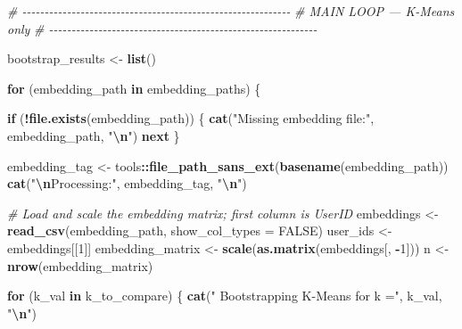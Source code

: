 \documentclass[
  11pt,
]{article}
\newenvironment{Shaded}{\begin{snugshade}}{\end{snugshade}}
\newcommand{\AttributeTok}[1]{\textcolor[rgb]{0.13,0.29,0.53}{#1}}
\newcommand{\CommentTok}[1]{\textcolor[rgb]{0.56,0.35,0.01}{\textit{#1}}}
\newcommand{\ConstantTok}[1]{\textcolor[rgb]{0.56,0.35,0.01}{#1}}
\newcommand{\ControlFlowTok}[1]{\textcolor[rgb]{0.13,0.29,0.53}{\textbf{#1}}}
\newcommand{\DecValTok}[1]{\textcolor[rgb]{0.00,0.00,0.81}{#1}}
\newcommand{\FunctionTok}[1]{\textcolor[rgb]{0.13,0.29,0.53}{\textbf{#1}}}
\newcommand{\NormalTok}[1]{#1}
\newcommand{\OtherTok}[1]{\textcolor[rgb]{0.56,0.35,0.01}{#1}}
\newcommand{\SpecialCharTok}[1]{\textcolor[rgb]{0.81,0.36,0.00}{\textbf{#1}}}
\newcommand{\StringTok}[1]{\textcolor[rgb]{0.31,0.60,0.02}{#1}}
\begin{document}
\begin{Shaded}
\begin{Highlighting}[]
\CommentTok{\# {-}{-}{-}{-}{-}{-}{-}{-}{-}{-}{-}{-}{-}{-}{-}{-}{-}{-}{-}{-}{-}{-}{-}{-}{-}{-}{-}{-}{-}{-}{-}{-}{-}{-}{-}{-}{-}{-}{-}{-}{-}{-}{-}{-}{-}{-}{-}{-}{-}{-}{-}{-}{-}{-}{-}{-}{-}{-}{-}{-}}
\CommentTok{\# MAIN LOOP — K{-}Means only}
\CommentTok{\# {-}{-}{-}{-}{-}{-}{-}{-}{-}{-}{-}{-}{-}{-}{-}{-}{-}{-}{-}{-}{-}{-}{-}{-}{-}{-}{-}{-}{-}{-}{-}{-}{-}{-}{-}{-}{-}{-}{-}{-}{-}{-}{-}{-}{-}{-}{-}{-}{-}{-}{-}{-}{-}{-}{-}{-}{-}{-}{-}{-}}

\NormalTok{bootstrap\_results }\OtherTok{\textless{}{-}} \FunctionTok{list}\NormalTok{()}

\ControlFlowTok{for}\NormalTok{ (embedding\_path }\ControlFlowTok{in}\NormalTok{ embedding\_paths) \{}

  \ControlFlowTok{if}\NormalTok{ (}\SpecialCharTok{!}\FunctionTok{file.exists}\NormalTok{(embedding\_path)) \{}
    \FunctionTok{cat}\NormalTok{(}\StringTok{"Missing embedding file:"}\NormalTok{, embedding\_path, }\StringTok{"}\SpecialCharTok{\textbackslash{}n}\StringTok{"}\NormalTok{)}
    \ControlFlowTok{next}
\NormalTok{  \}}

\NormalTok{  embedding\_tag    }\OtherTok{\textless{}{-}}\NormalTok{ tools}\SpecialCharTok{::}\FunctionTok{file\_path\_sans\_ext}\NormalTok{(}\FunctionTok{basename}\NormalTok{(embedding\_path))}
  \FunctionTok{cat}\NormalTok{(}\StringTok{"}\SpecialCharTok{\textbackslash{}n}\StringTok{Processing:"}\NormalTok{, embedding\_tag, }\StringTok{"}\SpecialCharTok{\textbackslash{}n}\StringTok{"}\NormalTok{)}

  \CommentTok{\# Load and scale the embedding matrix; first column is UserID}
\NormalTok{  embeddings       }\OtherTok{\textless{}{-}} \FunctionTok{read\_csv}\NormalTok{(embedding\_path, }\AttributeTok{show\_col\_types =} \ConstantTok{FALSE}\NormalTok{)}
\NormalTok{  user\_ids         }\OtherTok{\textless{}{-}}\NormalTok{ embeddings[[}\DecValTok{1}\NormalTok{]]}
\NormalTok{  embedding\_matrix }\OtherTok{\textless{}{-}} \FunctionTok{scale}\NormalTok{(}\FunctionTok{as.matrix}\NormalTok{(embeddings[, }\SpecialCharTok{{-}}\DecValTok{1}\NormalTok{]))}
\NormalTok{  n                }\OtherTok{\textless{}{-}} \FunctionTok{nrow}\NormalTok{(embedding\_matrix)}

  \ControlFlowTok{for}\NormalTok{ (k\_val }\ControlFlowTok{in}\NormalTok{ k\_to\_compare) \{}
    \FunctionTok{cat}\NormalTok{(}\StringTok{"  Bootstrapping K{-}Means for k ="}\NormalTok{, k\_val, }\StringTok{"}\SpecialCharTok{\textbackslash{}n}\StringTok{"}\NormalTok{)}


\end{Highlighting}
\end{Shaded}
\end{document}
